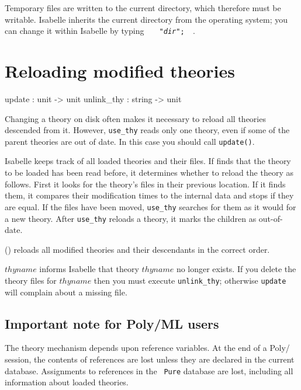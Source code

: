 \begin{warn}
Temporary files are written to the current directory, which therefore must
be writable.  Isabelle inherits the current directory from the operating
system; you can change it within Isabelle by typing \hbox{\tt\ \ 
   "{\it dir}";\ \ }.
\end{warn}


\section{Reloading modified theories}\label{sec:reloading-theories}
\indexbold{theories!reloading}
\begin{ttbox} 
update     : unit -> unit
unlink_thy : string -> unit
\end{ttbox}
Changing a theory on disk often makes it necessary to reload all theories
descended from it.  However, {\tt use_thy} reads only one theory, even if
some of the parent theories are out of date.  In this case you should call
{\tt update()}.

Isabelle keeps track of all loaded theories and their files.  If
\ttindex{use_thy} finds that the theory to be loaded has been read before,
it determines whether to reload the theory as follows.  First it looks for
the theory's files in their previous location.  If it finds them, it
compares their modification times to the internal data and stops if they
are equal.  If the files have been moved, {\tt use_thy} searches for them
as it would for a new theory.  After {\tt use_thy} reloads a theory, it
marks the children as out-of-date.

\begin{ttdescription}
\item[\ttindexbold{update}()] 
  reloads all modified theories and their descendants in the correct order.  

\item[\ttindexbold{unlink_thy} $thyname$]
  informs Isabelle that theory $thyname$ no longer exists.  If you delete the
  theory files for $thyname$ then you must execute {\tt unlink_thy};
  otherwise {\tt update} will complain about a missing file.
\end{ttdescription}


\goodbreak
\subsection{Important note for Poly/ML users}
The theory mechanism depends upon reference variables.  At the end of a
Poly/\ML{} session, the contents of references are lost unless they are
declared in the current database.  Assignments to references in the {\tt
  Pure} database are lost, including all information about loaded theories.

